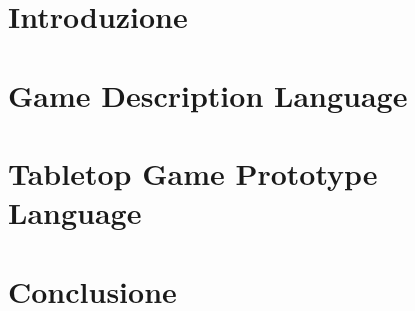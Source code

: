 \documentclass[12pt, twoside]{report}
\newcommand{\blankpage}{
    \null
    \thispagestyle{empty}
    \addtocounter{page}{-1}
    \newpage
}
\begin{document}



\blankpage
\tableofcontents

\chapter{Introduzione}


\chapter{Game Description Language}


\chapter{Tabletop Game Prototype Language}


\chapter{Conclusione}


\printbibliography
\end{document}

